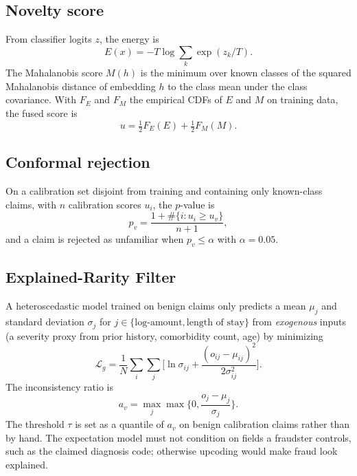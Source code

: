 \documentclass[conference]{IEEEtran}
\begin{document}
\subsection{Novelty score}
From classifier logits $z$, the energy is
\begin{equation}
E(x)=-T\log\sum_{k}\exp(z_k/T).
\end{equation}
The Mahalanobis score $M(h)$ is the minimum over known classes of the squared Mahalanobis distance of embedding $h$ to the class mean under the class covariance. With $F_E$ and $F_M$ the empirical CDFs of $E$ and $M$ on training data, the fused score is
\begin{equation}
u=\tfrac12 F_E(E)+\tfrac12 F_M(M).
\end{equation}

\subsection{Conformal rejection}
On a calibration set disjoint from training and containing only known-class claims, with $n$ calibration scores $u_i$, the $p$-value is
\begin{equation}
p_v=\frac{1+\#\{i:u_i\ge u_v\}}{n+1},
\end{equation}
and a claim is rejected as unfamiliar when $p_v\le\alpha$ with $\alpha=0.05$.

\subsection{Explained-Rarity Filter}
A heteroscedastic model trained on benign claims only predicts a mean $\mu_j$ and standard deviation $\sigma_j$ for $j\in\{\text{log-amount},\text{length of stay}\}$ from \emph{exogenous} inputs (a severity proxy from prior history, comorbidity count, age) by minimizing
\begin{equation}
\mathcal{L}_g=\frac{1}{N}\sum_{i}\sum_{j}\Big[\ln\sigma_{ij}+\frac{(o_{ij}-\mu_{ij})^2}{2\sigma_{ij}^2}\Big].
\end{equation}
The inconsistency ratio is
\begin{equation}
a_v=\max_j\max\Big\{0,\frac{o_j-\mu_j}{\sigma_j}\Big\}.
\end{equation}
The threshold $\tau$ is set as a quantile of $a_v$ on benign calibration claims rather than by hand. The expectation model must not condition on fields a fraudster controls, such as the claimed diagnosis code; otherwise upcoding would make fraud look explained.
\end{document}
